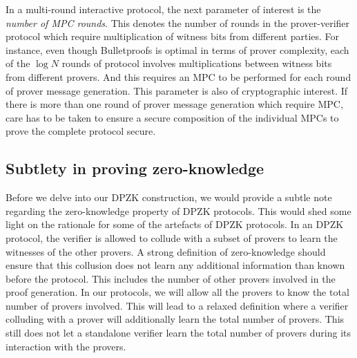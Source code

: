 In a multi-round interactive protocol, the next parameter of interest is the \textit{number of MPC rounds}. This denotes the number of rounds in the prover-verifier protocol which require multiplication of witness bits from different parties. For instance, even though Bulletproofs \cite{bulletproofs} is optimal in terms of prover complexity, each of the $\log N$ rounds of protocol involves multiplications between witness bits from different provers. And this requires an MPC to be performed for each round of prover message generation.
This parameter is also of cryptographic interest. If there is more than one round of prover message generation which require MPC, care has to be taken to ensure a secure composition of the individual MPCs to prove the complete protocol secure.

\subsection{Subtlety in proving zero-knowledge}
Before we delve into our DPZK construction, we would provide a subtle note regarding the zero-knowledge property of DPZK protocols. This would shed some light on the rationale for some of the artefacts of DPZK protocols. In an DPZK protocol, the verifier is allowed to collude with a subset of provers to learn the witnesses of the other provers. A strong definition of zero-knowledge should ensure that this collusion does not learn any additional information than known before the protocol. This includes the number of other provers involved in the proof generation.  In our protocols, we will allow all the provers to know the total number of provers involved. This will lead to a relaxed definition where a verifier colluding with a prover will additionally learn the total number of provers. This still does not let a standalone verifier learn the total number of provers during its interaction with the provers.

